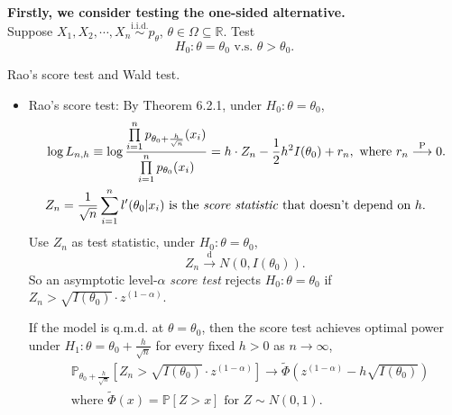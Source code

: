 \documentclass[a4paper]{article}
\begin{document}
\noindent \textbf{Firstly, we consider testing the one-sided alternative.} \\

\noindent Suppose $X_1,X_2,\cdots,X_n \stackrel{\text{i.i.d.}}{\sim} p_{\theta}$, $\theta \in \Omega \subseteq \mathbb{R}$. Test
\begin{equation*}
	H_0: \theta = \theta_0 \text{ v.s. } \theta > \theta_0.
\end{equation*}



\begin{answer}
	Rao's score test and Wald test.
\end{answer}

\begin{itemize}[leftmargin=*]
	\item Rao's score test: By Theorem 6.2.1, under $H_0: \theta = \theta_0$,
	\begin{equation*}
		\begin{aligned}
			& \log L_{n,h} \equiv \log \frac{\prod\limits_{i=1}^n p_{\theta_0 + \frac{h}{\sqrt{n}}} (x_i)}{\prod\limits_{i=1}^n p_{\theta_0} (x_i)} = h \cdot Z_n - \frac{1}{2} h^2 I(\theta_0) + r_n, \text{ where } r_n \stackrel{\text{P}}{\longrightarrow} 0. \\
			& Z_n = \frac{1}{\sqrt{n}} \sum\limits_{i=1}^n l'(\theta_0|x_i) \text{ is the \emph{score statistic} that doesn't depend on $h$.}
		\end{aligned}
	\end{equation*}
	Use $Z_n$ as test statistic, under $H_0: \theta = \theta_0$,
	\begin{equation*}
		Z_n \stackrel{\text{d}}{\longrightarrow} N(0,I(\theta_0)).
	\end{equation*}
	So an asymptotic level-$\alpha$ \emph{score test} rejects $H_0: \theta = \theta_0$ if $Z_n > \sqrt{I(\theta_0)} \cdot z^{(1-\alpha)}$.
	
	\begin{prop}
		If the model is q.m.d. at $\theta = \theta_0$, then the score test achieves optimal power under $H_1: \theta = \theta_0 + \frac{h}{\sqrt{n}}$ for every fixed $h > 0$ as $n \to \infty$,
		\begin{equation*}
			\begin{aligned}
				& \mathbb{P}_{\theta_0+\frac{h}{\sqrt{n}}} \left[Z_n > \sqrt{I(\theta_0)} \cdot z^{(1-\alpha)}\right] \to \tilde{\Phi}(z^{(1-\alpha)} - h \sqrt{I(\theta_0)}) \\
				& \text{where  $\tilde{\Phi}(x) = \mathbb{P}[Z > x]$ for $Z \sim N(0,1)$.}
			\end{aligned}
		\end{equation*} 
	\end{prop}


\end{itemize}
\end{document}

